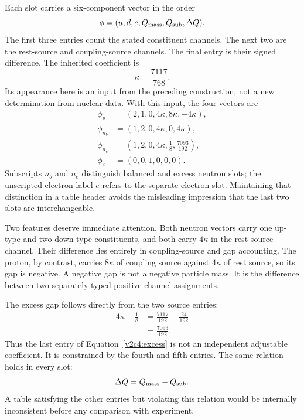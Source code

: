 Each slot carries a six-component vector in the order
\begin{equation}
 \phi=(u,d,e,Q_{\rm mass},Q_{\rm sub},\Delta Q).
 \label{v2c4:vectororder}
\end{equation}
The first three entries count the stated constituent channels. The next two are the rest-source and coupling-source channels. The final entry is their signed difference. The inherited coefficient is
\begin{equation}
 \kappa=\frac{7117}{768}.
 \label{v2c4:kappa}
\end{equation}
Its appearance here is an input from the preceding construction, not a new determination from nuclear data. With this input, the four vectors are
\begin{align}
 \phi_p&=(2,1,0,4\kappa,8\kappa,-4\kappa),
 \label{v2c4:proton}\\
 \phi_{n_b}&=(1,2,0,4\kappa,0,4\kappa),
 \label{v2c4:balanced}\\
 \phi_{n_e}&=\left(1,2,0,4\kappa,\frac18,
                  \frac{7093}{192}\right),
 \label{v2c4:excess}\\
 \phi_e&=(0,0,1,0,0,0).
 \label{v2c4:electron}
\end{align}
Subscripts $n_b$ and $n_e$ distinguish balanced and excess neutron slots; the unscripted electron label $e$ refers to the separate electron slot. Maintaining that distinction in a table header avoids the misleading impression that the last two slots are interchangeable.

Two features deserve immediate attention. Both neutron vectors carry one up-type and two down-type constituents, and both carry $4\kappa$ in the rest-source channel. Their difference lies entirely in coupling-source and gap accounting. The proton, by contrast, carries $8\kappa$ of coupling source against $4\kappa$ of rest source, so its gap is negative. A negative gap is not a negative particle mass. It is the difference between two separately typed positive-channel assignments.

The excess gap follows directly from the two source entries:
\begin{align}
 4\kappa-\frac18
 &=\frac{7117}{192}-\frac{24}{192}\nonumber\\
 &=\frac{7093}{192}.
 \label{v2c4:excessgap}
\end{align}
Thus the last entry of Equation~\eqref{v2c4:excess} is not an independent adjustable coefficient. It is constrained by the fourth and fifth entries. The same relation holds in every slot:
\begin{equation}
 \Delta Q=Q_{\rm mass}-Q_{\rm sub}.
 \label{v2c4:gapdefinition}
\end{equation}
A table satisfying the other entries but violating this relation would be internally inconsistent before any comparison with experiment.

